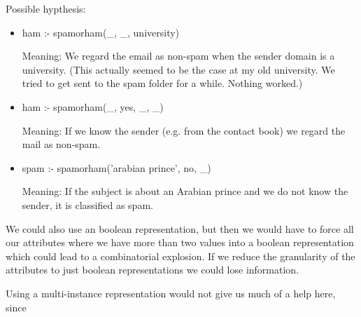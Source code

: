 \documentclass[a4paper]{article}
\begin{document}
\medskip
Possible hypthesis:
\begin{itemize}
\item ham :- spamorham(\_, \_, university) 

Meaning: We regard the email as non-spam when the sender domain is a university. (This actually seemed to be the case at my old university. We tried to get sent to the spam folder for a while. Nothing worked.)
\item ham :- spamorham(\_, yes, \_, \_)

Meaning: If we know the sender (e.g. from the contact book) we regard the mail as non-spam.
\item spam :- spamorham('arabian prince', no, \_)

Meaning: If the subject is about an Arabian prince and we do not know the sender, it is classified as spam.
\end{itemize}

We could also use an boolean representation, but then we would have to force all our attributes where we have more than two values into a boolean representation which could lead to a combinatorial explosion. If we reduce the granularity of the attributes to just boolean representations we could lose information.

Using a multi-instance representation would not give us much of a help here, since
\end{document}
